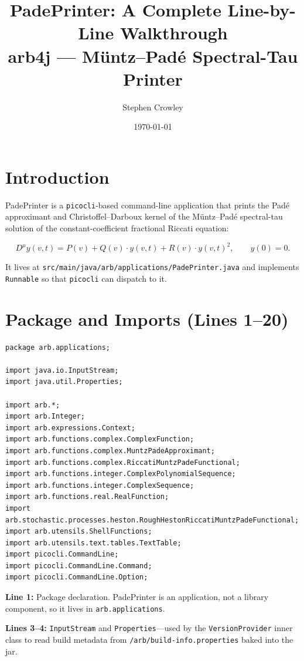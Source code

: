 \documentclass[a4paper,11pt]{article}
\title{\textbf{PadePrinter: A Complete Line-by-Line Walkthrough}\\[4pt]
       \large arb4j --- M\"untz--Pad\'e Spectral-Tau Printer}
\author{Stephen Crowley}
\date{\today}
\begin{document}
\maketitle
\tableofcontents
\newpage

\section{Introduction}

PadePrinter is a \texttt{picocli}-based command-line application that prints the
Pad\'e approximant and Christoffel--Darboux kernel of the M\"untz--Pad\'e
spectral-tau solution of the constant-coefficient fractional Riccati equation:

\[
D^{\mu} y(v,t) = P(v) + Q(v)\cdot y(v,t) + R(v)\cdot y(v,t)^{2},\qquad y(0)=0.
\]

It lives at \texttt{src/main/java/arb/applications/PadePrinter.java} and
implements \texttt{Runnable} so that \texttt{picocli} can dispatch to it.

\section{Package and Imports (Lines 1--20)}

\begin{lstlisting}
package arb.applications;

import java.io.InputStream;
import java.util.Properties;

import arb.*;
import arb.Integer;
import arb.expressions.Context;
import arb.functions.complex.ComplexFunction;
import arb.functions.complex.MuntzPadeApproximant;
import arb.functions.complex.RiccatiMuntzPadeFunctional;
import arb.functions.integer.ComplexPolynomialSequence;
import arb.functions.integer.ComplexSequence;
import arb.functions.real.RealFunction;
import arb.stochastic.processes.heston.RoughHestonRiccatiMuntzPadeFunctional;
import arb.utensils.ShellFunctions;
import arb.utensils.text.tables.TextTable;
import picocli.CommandLine;
import picocli.CommandLine.Command;
import picocli.CommandLine.Option;
\end{lstlisting}

\textbf{Line 1:} Package declaration. PadePrinter is an application, not a
library component, so it lives in \texttt{arb.applications}.

\textbf{Lines 3--4:} \texttt{InputStream} and \texttt{Properties}---used by the
\texttt{VersionProvider} inner class to read build metadata from
\texttt{/arb/build-info.properties} baked into the jar.
\end{document}
